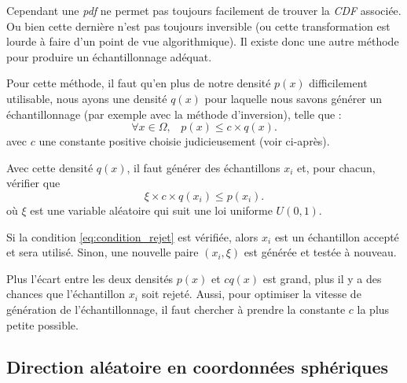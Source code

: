 Cependant une \textit{pdf} ne permet pas toujours facilement de trouver la \textit{CDF} associée. Ou bien cette dernière n'est pas toujours inversible (ou cette transformation est lourde à faire d'un point de vue algorithmique). Il existe donc une autre méthode pour produire un échantillonnage adéquat.\par
Pour cette méthode, il faut qu'en plus de notre densité $p(x)$ difficilement utilisable, nous ayons une densité $q(x)$ pour laquelle nous savons générer un échantillonnage (par exemple avec la méthode d'inversion), telle que :
\large \begin{equation}
    \forall x \in \Omega
    \text{,}\quad
    p(x) \leq c \times q(x)
.\end{equation} \normalsize
avec $c$ une constante positive choisie judicieusement (voir ci-après).\newline\par

Avec cette densité $q(x)$, il faut générer des échantillons $x_{i}$ et, pour chacun, vérifier que
\large \begin{equation}\label{eq:condition_rejet}
    \xi \times c \times q(x_{i}) \leq p(x_{i})
.\end{equation} \normalsize
où $\xi$ est une variable aléatoire qui suit une loi uniforme $U(0, 1)$.\par
Si la condition \ref{eq:condition_rejet} est vérifiée, alors $x_{i}$ est un échantillon accepté et sera utilisé. Sinon, une nouvelle paire $(x_{i}, \xi)$ est générée et testée à nouveau.\newline\par

Plus l'écart entre les deux densités $p(x)$ et $cq(x)$ est grand, plus il y a des chances que l'échantillon $x_{i}$ soit rejeté. Aussi, pour optimiser la vitesse de génération de l'échantillonnage, il faut chercher à prendre la constante $c$ la plus petite possible.


\subsection{Direction aléatoire en coordonnées sphériques}

